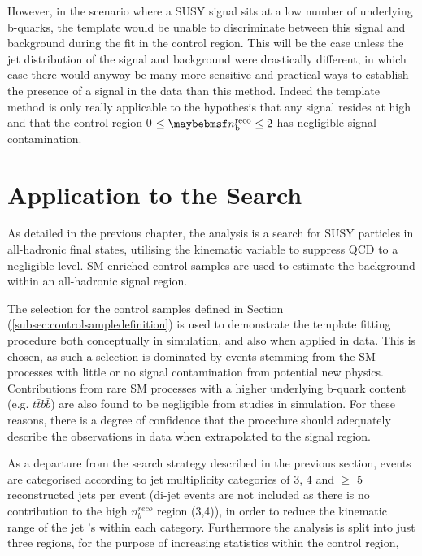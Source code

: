 However, in the scenario where a \ac{SUSY} signal sits at a low number of underlying b-quarks, the template would be unable to discriminate between this signal and background during the fit in the control region. This will be the case unless the jet \pt distribution of the signal and background were drastically different, in which case there would anyway be many more sensitive and practical ways to establish the presence of a signal in the data than this method. Indeed the template method is only really applicable to the hypothesis that any signal resides at high \nbreco and that the control region 0 $\leq \nbreco \leq 2$ has negligible signal contamination.  

\FloatBarrier
\section{ Application to the \alphat Search}
\label{sec:templateapplication}

As detailed in the previous chapter, the \alphat analysis is a search for \ac{SUSY} particles in all-hadronic final states, utilising the kinematic variable \alphat to suppress QCD to a negligible level. \ac{SM} enriched control samples are used to estimate the background within an all-hadronic signal region. 

The selection for the \mupjets control samples defined in Section (\ref{subsec:controlsampledefinition}) is used to demonstrate the template fitting procedure both conceptually in simulation, and also when applied in data. This is chosen, as such a selection is dominated by events stemming from the \ac{SM} processes with little or no signal contamination from potential new physics. Contributions from rare \ac{SM} processes with a higher underlying b-quark content (e.g. $t\bar{t}b\bar{b}$) are also found to be negligible from studies in simulation. For these reasons, there is a degree of confidence that the procedure should adequately describe the observations in data when extrapolated to the signal region.

As a departure from the \alphat search strategy described in the previous section, events are categorised according to jet multiplicity categories of 3, 4 and $\geq$ 5 reconstructed jets per event (di-jet events are not included as there is no contribution to the high $n_{b}^{reco}$ region (3,4)), in order to reduce the kinematic range of the jet \pt's within each category. Furthermore the analysis is split into just three \theht regions, for the purpose of increasing statistics within the control region, 

